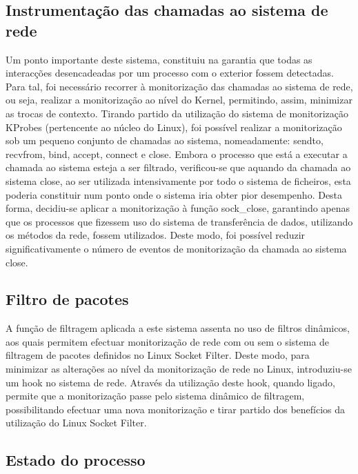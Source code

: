 \documentclass[a4paper]{llncs}
\begin{document}
\subsection*{Instrumentação das chamadas ao sistema de rede}
\label{sub:mon_syscalls}

Um ponto importante deste sistema, constituiu na garantia que todas as interacções desencadeadas por um processo com o exterior fossem detectadas. Para tal, foi necessário recorrer à monitorização das chamadas ao sistema de rede, ou seja, realizar a monitorização ao nível do Kernel, permitindo, assim, minimizar as trocas de contexto. Tirando partido da utilização do sistema de monitorização KProbes (pertencente ao núcleo do Linux), foi possível realizar a monitorização sob um pequeno conjunto de chamadas ao sistema, nomeadamente: sendto, recvfrom, bind, accept, connect e close. Embora o processo que está a executar a chamada ao sistema esteja a ser filtrado, verificou-se que aquando da chamada ao sistema close, ao ser utilizada intensivamente por todo o sistema de ficheiros, esta poderia constituir num ponto onde o sistema iria obter pior desempenho. Desta forma, decidiu-se aplicar a monitorização à função sock\_close, garantindo apenas que os processos que fizessem uso do sistema de transferência de dados, utilizando os métodos da rede, fossem utilizados. Deste modo, foi possível reduzir significativamente o número de eventos de monitorização da chamada ao sistema close.

\subsection*{Filtro de pacotes}
\label{sub:packet_filter}

A função de filtragem aplicada a este sistema assenta no uso de filtros dinâmicos, aos quais permitem efectuar monitorização de rede com ou sem o sistema de filtragem de pacotes definidos no Linux Socket Filter. Deste modo, para minimizar as alterações ao nível da monitorização de rede no Linux, introduziu-se um hook no sistema de rede. Através da utilização deste hook, quando ligado, permite que a monitorização passe pelo sistema dinâmico de filtragem, possibilitando efectuar uma nova monitorização e tirar partido dos benefícios da utilização do Linux Socket Filter.

\subsection*{Estado do processo}
\label{sub:data_repository}
\end{document}
